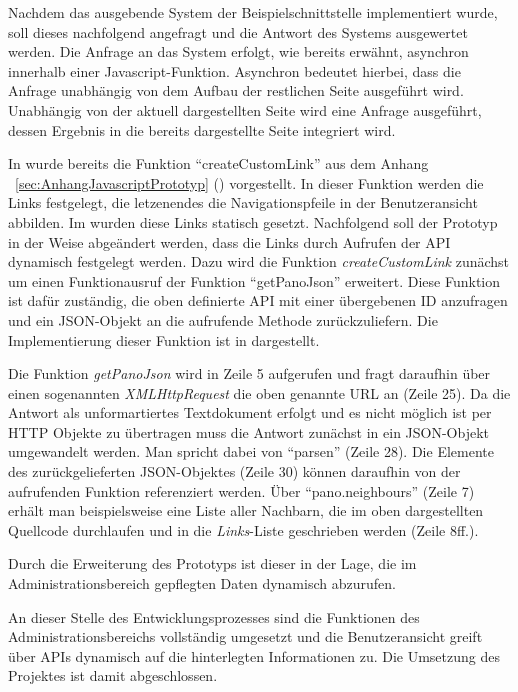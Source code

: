 Nachdem das ausgebende System der Beispielschnittstelle implementiert wurde,
soll dieses nachfolgend angefragt und die Antwort des Systems ausgewertet
werden. Die Anfrage an das System erfolgt, wie bereits erwähnt, asynchron
innerhalb einer Javascript-Funktion. Asynchron bedeutet hierbei, dass die
Anfrage unabhängig von dem Aufbau der restlichen Seite ausgeführt wird.
Unabhängig von der aktuell dargestellten Seite wird eine Anfrage ausgeführt,
dessen Ergebnis in die bereits dargestellte Seite integriert wird.

In  wurde bereits die Funktion "`createCustomLink"' aus dem
Anhang ~\ref{sec:AnhangJavascriptPrototyp}
() vorgestellt. In dieser Funktion
werden die Links festgelegt, die letzenendes die Navigationspfeile in der
Benutzeransicht abbilden. Im  wurden diese Links statisch
gesetzt. Nachfolgend soll der Prototyp in der Weise abgeändert werden, dass die
Links durch Aufrufen der API dynamisch festgelegt werden. Dazu wird die Funktion
\textit{createCustomLink} zunächst um einen Funktionausruf der Funktion
"`getPanoJson"' erweitert. Diese Funktion ist dafür zuständig, die oben
definierte API mit einer übergebenen ID anzufragen und ein JSON-Objekt an die
aufrufende Methode zurückzuliefern. Die Implementierung dieser Funktion ist in
 dargestellt.



Die Funktion \textit{getPanoJson} wird in Zeile 5 aufgerufen und fragt daraufhin
über einen sogenannten \textit{XMLHttpRequest} die oben genannte URL an (Zeile
25). Da die Antwort als unformartiertes Textdokument erfolgt und es nicht
möglich ist per HTTP Objekte zu übertragen muss die Antwort zunächst in ein
JSON-Objekt umgewandelt werden. Man spricht dabei von "`parsen"' (Zeile 28). Die
Elemente des zurückgelieferten JSON-Objektes (Zeile 30) können daraufhin von der
aufrufenden Funktion referenziert werden. Über "`pano.neighbours"' (Zeile 7)
erhält man beispielsweise eine Liste aller Nachbarn, die im oben dargestellten
Quellcode durchlaufen und in die \textit{Links}-Liste geschrieben werden (Zeile
8ff.).

Durch die Erweiterung des Prototyps ist dieser in der Lage, die im
Administrationsbereich gepflegten Daten dynamisch abzurufen.

An dieser Stelle des Entwicklungsprozesses sind die Funktionen des
Administrationsbereichs vollständig umgesetzt und die Benutzeransicht greift
über APIs dynamisch auf die hinterlegten Informationen zu. Die Umsetzung des
Projektes ist damit abgeschlossen.